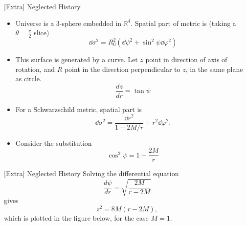 \documentclass[aspectratio=169,xcolor=dvipsnames]{beamer}
\begin{document}
\begin{frame}{[Extra] Neglected History}
    \begin{itemize}
        \item Universe is a 3-sphere embedded in $\mathbb{R}^4.$ Spatial part of metric is (taking a $\theta=\frac{\pi}{2}$ slice)
        \begin{equation}
            \dd{\sigma}^2 = R_0^2\left(\dd{\psi}^2 + \sin^2\psi\dd{\varphi}^2\right)
        \end{equation}
        \item This surface is generated by a curve. Let $z$ point in direction of axis of rotation, and $R$ point in the direction perpendicular to $z$, in the same plane as circle.
        \begin{equation}
            \frac{dz}{dr} = \tan\psi
        \end{equation}
        \item For a Schwarzschild metric, spatial part is 
        \begin{equation}
            \dd{\sigma}^2 = \frac{\dd{r}^2}{1-2M/r} + r^2\dd{\varphi}^2.
        \end{equation}
        \item Consider the substitution 
        \begin{equation}
            \cos^2\psi = 1 - \frac{2M}{r}
        \end{equation}
    \end{itemize}
\end{frame}
\begin{frame}{[Extra] Neglected History}
    Solving the differential equation 
\begin{equation}
    \frac{d\psi}{dr} = \sqrt{\frac{2M}{r-2M}}
\end{equation} 
gives
\begin{equation}
    z^2 = 8M(r-2M),
\end{equation}
which is plotted in the figure below, for the case $M=1.$
\begin{center}
\end{center}
\end{frame}
\end{document}
